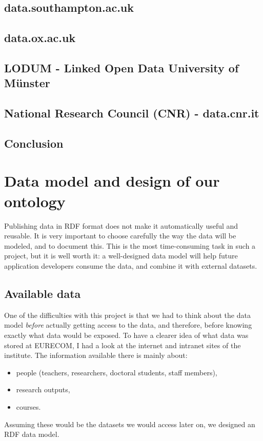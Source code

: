 \documentclass[a4paper,11pt]{report}
\begin{document}
\section*{data.southampton.ac.uk}
\section*{data.ox.ac.uk}
\section*{LODUM - Linked Open Data University of Münster}
\section*{National Research Council (CNR) - data.cnr.it}
\section*{Conclusion}



\chapter{Data model and design of our ontology}
Publishing data in RDF format does not make it automatically useful and reusable. It is very important to choose carefully the way the data will be modeled, and to document this. This is the most time-consuming task in such a project, but it is well worth it: a well-designed data model will help future application developers consume the data, and combine it with external datasets. 
\section{Available data}
One of the difficulties with this project is that we had to think about the data model \emph{before} actually getting access to the data, and therefore, before knowing exactly what data would be exposed. To have a clearer idea of what data was stored at EURECOM, I had a look at the internet and intranet sites of the institute. The information available there is mainly about: 
\begin{itemize}
\item people (teachers, researchers, doctoral students, staff members), 
\item research outputs, 
\item courses. 
\end{itemize}
Assuming these would be the datasets we would access later on, we designed an RDF data model. %
 
\end{document}
